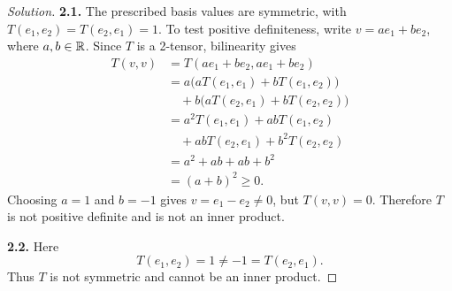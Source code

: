 \begin{proof}[Solution]
  \textbf{2.1.} The prescribed basis values are symmetric, with
  \(T(e_1,e_2)=T(e_2,e_1)=1\). To test positive definiteness, write
  \(v=ae_1+be_2\), where \(a,b\in\mathbb{R}\). Since \(T\) is a
  2-tensor, bilinearity gives
  \[
    \begin{aligned}
      T(v,v)&=T(ae_1+be_2,ae_1+be_2)\\
        &=a\bigl(aT(e_1,e_1)+bT(e_1,e_2)\bigr)\\
        &\quad +b\bigl(aT(e_2,e_1)+bT(e_2,e_2)\bigr)\\
        &=a^2T(e_1,e_1)+abT(e_1,e_2)\\
        &\quad +abT(e_2,e_1)+b^2T(e_2,e_2)\\
        &=a^2+ab+ab+b^2\\
        &=(a+b)^2\ge0.
    \end{aligned}
  \]
  Choosing \(a=1\) and \(b=-1\) gives \(v=e_1-e_2\ne0\), but
  \(T(v,v)=0\). Therefore \(T\) is not positive definite and is
  not an inner product.

  \textbf{2.2.} Here
  \[
    T(e_1,e_2)=1\ne-1=T(e_2,e_1).
  \]
  Thus \(T\) is not symmetric and cannot be an inner product.
\end{proof}
